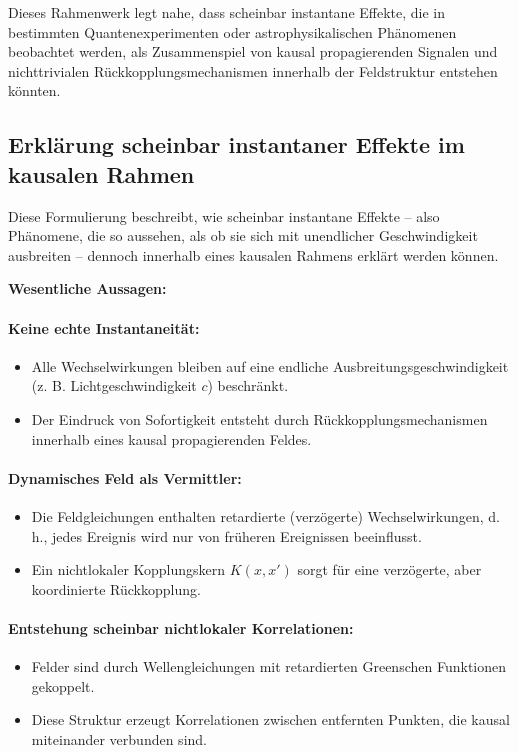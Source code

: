 \documentclass[a4paper,11pt]{article}
\begin{document}
	Dieses Rahmenwerk legt nahe, dass scheinbar instantane Effekte, die in bestimmten Quantenexperimenten oder astrophysikalischen Phänomenen beobachtet werden, als Zusammenspiel von kausal propagierenden Signalen und nichttrivialen Rückkopplungsmechanismen innerhalb der Feldstruktur entstehen könnten.
	\subsection{Erklärung scheinbar instantaner Effekte im kausalen Rahmen}
	
	Diese Formulierung beschreibt, wie scheinbar instantane Effekte – also Phänomene, die so aussehen, als ob sie sich mit unendlicher Geschwindigkeit ausbreiten – dennoch innerhalb eines kausalen Rahmens erklärt werden können.
	
	\textbf{Wesentliche Aussagen:}
	
	\paragraph{Keine echte Instantaneität:}
	\begin{itemize}
		\item Alle Wechselwirkungen bleiben auf eine endliche Ausbreitungsgeschwindigkeit (z. B. Lichtgeschwindigkeit $c$) beschränkt.
		\item Der Eindruck von Sofortigkeit entsteht durch Rückkopplungsmechanismen innerhalb eines kausal propagierenden Feldes.
	\end{itemize}
	
	\paragraph{Dynamisches Feld als Vermittler:}
	\begin{itemize}
		\item Die Feldgleichungen enthalten retardierte (verzögerte) Wechselwirkungen, d. h., jedes Ereignis wird nur von früheren Ereignissen beeinflusst.
		\item Ein nichtlokaler Kopplungskern $K(x,x')$ sorgt für eine verzögerte, aber koordinierte Rückkopplung.
	\end{itemize}
	
	\paragraph{Entstehung scheinbar nichtlokaler Korrelationen:}
	\begin{itemize}
		\item Felder sind durch Wellengleichungen mit retardierten Greenschen Funktionen gekoppelt.
		\item Diese Struktur erzeugt Korrelationen zwischen entfernten Punkten, die kausal miteinander verbunden sind.
	\end{itemize}
	
\end{document}
